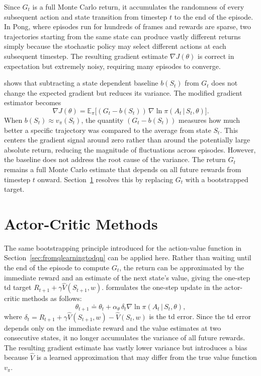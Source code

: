 Since $G_t$ is a full Monte Carlo return, it accumulates the randomness of every subsequent action and state transition from timestep $t$ to the end of the episode. In Pong, where episodes run for hundreds of frames and rewards are sparse, two trajectories starting from the same state can produce vastly different returns simply because the stochastic policy may select different actions at each subsequent timestep. The resulting gradient estimate $\nabla J(\theta)$ is correct in expectation but extremely noisy, requiring many episodes to converge.

\citet[p.~329]{suttonReinforcementLearningIntroduction2020} shows that subtracting a state dependent baseline $b(S_t)$ \citep{williamsSimpleStatisticalGradientfollowing1992} from $G_t$ does not change the expected gradient but reduces its variance. The modified gradient estimator becomes
\begin{equation}\label{eq:reinforce_baseline}
	\nabla J(\theta) = \mathbb{E}_\pi \bigg[(G_t - b(S_t))\, \nabla \ln \pi(A_t\,|\,S_t, \theta) \bigg].
\end{equation}
When $b(S_t) \approx v_\pi(S_t)$, the quantity $(G_t - b(S_t))$ measures how much better a specific trajectory was compared to the average from state $S_t$. This centers the gradient signal around zero rather than around the potentially large absolute return, reducing the magnitude of fluctuations across episodes. However, the baseline does not address the root cause of the variance. The return $G_t$ remains a full Monte Carlo estimate that depends on all future rewards from timestep $t$ onward. Section~\ref{sec:actorcriticmethods} resolves this by replacing $G_t$ with a bootstrapped target.

\section{Actor-Critic Methods}
\label{sec:actorcriticmethods}
The same bootstrapping principle introduced for the action-value function in Section~\ref{sec:fromqlearningtodqn} can be applied here. Rather than waiting until the end of the episode to compute $G_t$, the return can be approximated by the immediate reward and an estimate of the next state's value, giving the one-step \acrshort{td} target $R_{t+1} + \gamma \hat{V}(S_{t+1}, w)$. \citet[p.~331]{suttonReinforcementLearningIntroduction2020} formulates the one-step update in the actor-critic methods as follows:
\begin{equation}\label{eq:one_step_update}
	\theta_{t+1} \doteq \theta_t + \alpha_{\theta}\,\delta_t \nabla \ln \pi(A_t\,|\,S_t, \theta),
\end{equation}
where $\delta_t = R_{t+1} + \gamma \hat{V}(S_{t+1}, w) - \hat{V}(S_t, w)$ is the \acrshort{td} error. Since the \acrshort{td} error depends only on the immediate reward and the value estimates at two consecutive states, it no longer accumulates the variance of all future rewards. The resulting gradient estimate has vastly lower variance but introduces a bias because $\hat{V}$ is a learned approximation that may differ from the true value function $v_\pi$.

